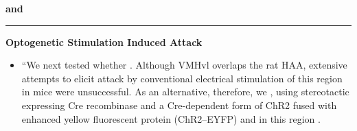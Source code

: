\documentclass[basic,plain]{inVerba-notes}
\begin{document}
\begin{center}
  {\Large\textbf{ and }}
\end{center}

\hrule
\medskip

{\large\textbf{Optogenetic Stimulation Induced Attack}}
\begin{itemize}
  \item ``We next tested whether . Although VMHvl overlaps the rat HAA, extensive attempts to elicit attack by conventional electrical stimulation of this region in mice were unsuccessful. As an alternative, therefore, we , using stereotactic  expressing Cre recombinase and a Cre-dependent form of ChR2 fused with enhanced yellow fluorescent protein (ChR2–EYFP) and  in this region .
  

\end{itemize}
\end{document}
